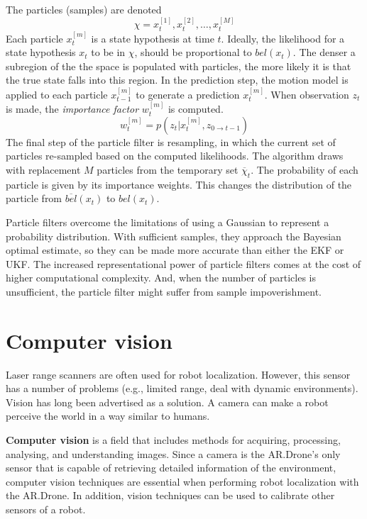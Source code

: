 {The particles (samples) are denoted
\begin{equation}
\chi = x_t^{[1]}, x_t^{[2]}, \hdots, x_t^{[M]}
\end{equation}
Each particle $x_t^{[m]}$ is a state hypothesis at time $t$.
Ideally, the likelihood for a state hypothesis $x_t$ to be in $\chi$, should be proportional to $bel(x_t)$.
The denser a subregion of the the space is populated with particles, the more likely it is that the true state falls into this region.
In the prediction step, the motion model is applied to each particle $x_{t-1}^{[m]}$ to generate a prediction $x_t^{[m]}$.
When observation $z_t$ is made, the \textit{importance factor} $w_t^{[m]}$ is computed.
\begin{equation}
w_t^{[m]} = p ( z_t | x_t^{[m]}, z_{0 \to t-1})
\end{equation}
The final step of the particle filter is {resampling}, in which the current set of particles re-sampled based on the computed likelihoods.
The algorithm draws with replacement $M$ particles from the temporary set $\overline{\chi}_t$.
The probability of each particle is given by its importance weights.
This changes the distribution of the particle from $\overline{bel}(x_t)$ to $bel(x_t)$.

Particle filters overcome the limitations of using a Gaussian to represent a probability distribution.
With sufficient samples, they approach the Bayesian optimal estimate, so they can be made more accurate than either the EKF or UKF.
The increased representational power of particle filters comes at the cost of higher computational complexity.
And, when the number of particles is unsufficient, the particle filter might suffer from sample impoverishment.



\section{Computer vision}
Laser range scanners are often used for robot localization.
However, this sensor has a number of problems (e.g., limited range, deal with dynamic environments).
Vision has long been advertised as a solution.
A camera can make a robot perceive the world in a way similar to humans.

\textbf{Computer vision} is a field that includes methods for acquiring, processing, analysing, and understanding images.
Since a camera is the AR.Drone's only sensor that is capable of retrieving detailed information of the environment, computer vision techniques are essential when performing robot localization with the AR.Drone.
In addition, vision techniques can be used to calibrate other sensors of a robot.

}
